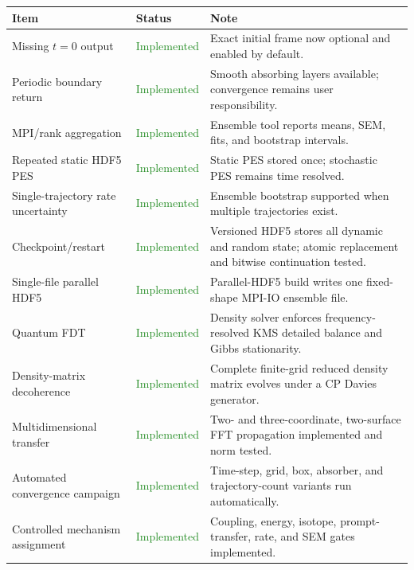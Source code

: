 \documentclass[11pt]{article}
\newcommand{\statusdone}{\textcolor{ForestGreen}{Implemented}}
\begin{document}
\begingroup\setlength{\parskip}{0pt}
\begin{tabular}{>{\raggedright\arraybackslash}p{}>{\raggedright\arraybackslash}p{}>{\raggedright\arraybackslash}p{}}
\toprule
Item & Status & Note\\
\midrule
Missing $t=0$ output & \statusdone & Exact initial frame now optional and enabled by default.\\
Periodic boundary return & \statusdone & Smooth absorbing layers available; convergence remains user responsibility.\\
MPI/rank aggregation & \statusdone & Ensemble tool reports means, SEM, fits, and bootstrap intervals.\\
Repeated static HDF5 PES & \statusdone & Static PES stored once; stochastic PES remains time resolved.\\
Single-trajectory rate uncertainty & \statusdone & Ensemble bootstrap supported when multiple trajectories exist.\\
Checkpoint/restart & \statusdone & Versioned HDF5 stores all dynamic and random state; atomic replacement and bitwise continuation tested.\\
Single-file parallel HDF5 & \statusdone & Parallel-HDF5 build writes one fixed-shape MPI-IO ensemble file.\\
Quantum FDT & \statusdone & Density solver enforces frequency-resolved KMS detailed balance and Gibbs stationarity.\\
Density-matrix decoherence & \statusdone & Complete finite-grid reduced density matrix evolves under a CP Davies generator.\\
Multidimensional transfer & \statusdone & Two- and three-coordinate, two-surface FFT propagation implemented and norm tested.\\
Automated convergence campaign & \statusdone & Time-step, grid, box, absorber, and trajectory-count variants run automatically.\\
Controlled mechanism assignment & \statusdone & Coupling, energy, isotope, prompt-transfer, rate, and SEM gates implemented.\\
\bottomrule
\end{tabular}
\endgroup
\end{document}
